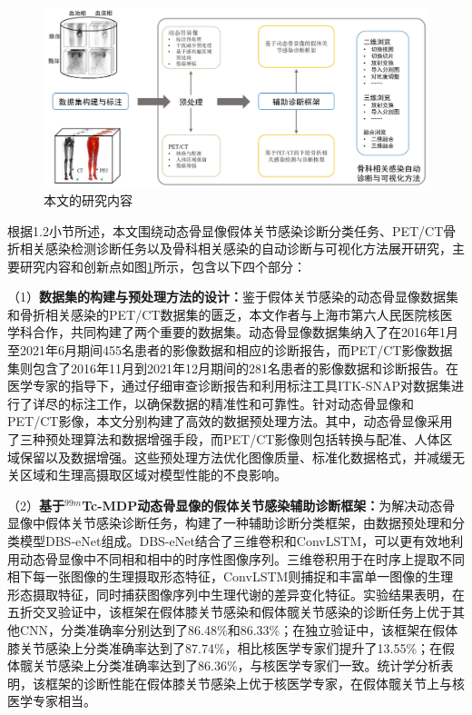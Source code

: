 \begin{figure}[htbp]
  \centering
  \includegraphics[width=\textwidth]{figures/chap01_research.jpg}
  \caption{本文的研究内容}
  \label{fig:chap01_research}
\end{figure}

根据1.2小节所述，本文围绕动态骨显像假体关节感染诊断分类任务、PET/CT骨折相关感染检测诊断任务以及骨科相关感染的自动诊断与可视化方法展开研究，主要研究内容和创新点如图\ref{fig:chap01_research}所示，包含以下四个部分：

（1）\textbf{数据集的构建与预处理方法的设计：}鉴于假体关节感染的动态骨显像数据集和骨折相关感染的PET/CT数据集的匮乏，本文作者与上海市第六人民医院核医学科合作，共同构建了两个重要的数据集。动态骨显像数据集纳入了在2016年1月至2021年6月期间455名患者的影像数据和相应的诊断报告，而PET/CT影像数据集则包含了2016年11月到2021年12月期间的281名患者的影像数据和诊断报告。在医学专家的指导下，通过仔细审查诊断报告和利用标注工具ITK-SNAP对数据集进行了详尽的标注工作，以确保数据的精准性和可靠性。针对动态骨显像和PET/CT影像，本文分别构建了高效的数据预处理方法。其中，动态骨显像采用了三种预处理算法和数据增强手段，而PET/CT影像则包括转换与配准、人体区域保留以及数据增强。这些预处理方法优化图像质量、标准化数据格式，并减缓无关区域和生理高摄取区域对模型性能的不良影响。

（2）\textbf{基于\(^{99m}\)Tc-MDP动态骨显像的假体关节感染辅助诊断框架：}为解决动态骨显像中假体关节感染诊断任务，构建了一种辅助诊断分类框架，由数据预处理和分类模型DBS-eNet组成。DBS-eNet结合了三维卷积和ConvLSTM，可以更有效地利用动态骨显像中不同相和相中的时序性图像序列。三维卷积用于在时序上提取不同相下每一张图像的生理摄取形态特征，ConvLSTM则捕捉和丰富单一图像的生理形态摄取特征，同时捕获图像序列中生理代谢的差异变化特征。实验结果表明，在五折交叉验证中，该框架在假体膝关节感染和假体髋关节感染的诊断任务上优于其他CNN，分类准确率分别达到了86.48\%和86.33\%；在独立验证中，该框架在假体膝关节感染上分类准确率达到了87.74\%，相比核医学专家们提升了13.55\%；在假体髋关节感染上分类准确率达到了86.36\%，与核医学专家们一致。统计学分析表明，该框架的诊断性能在假体膝关节感染上优于核医学专家，在假体髋关节上与核医学专家相当。

